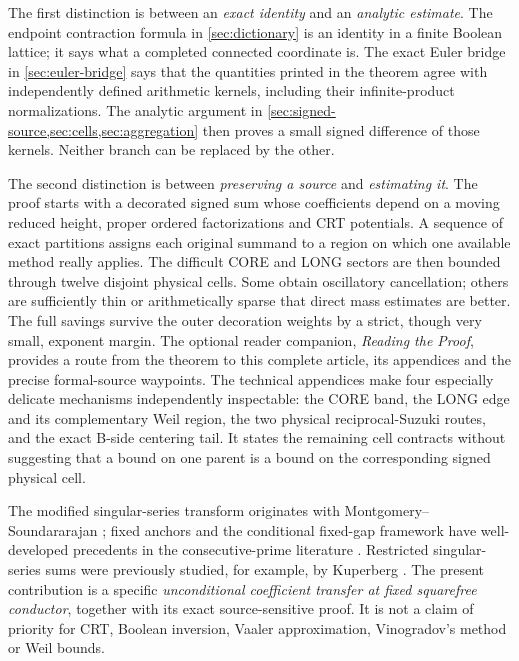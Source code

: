 \documentclass[11pt]{article}
\theoremstyle{definition}
\theoremstyle{remark}
\newcommand{\1}{\mathbf 1}
\begin{document}
The first distinction is between an \emph{exact identity} and
an \emph{analytic estimate}. The endpoint contraction formula in
\cref{sec:dictionary} is an identity in a finite Boolean lattice;
it says what a completed connected coordinate is. The exact
Euler bridge in \cref{sec:euler-bridge} says that the quantities
printed in the theorem agree with independently defined arithmetic
kernels, including their infinite-product normalizations. The
analytic argument in \cref{sec:signed-source,sec:cells,sec:aggregation}
then proves a small signed difference of those kernels.
Neither branch can be replaced by the other.

The second distinction is between \emph{preserving a source} and
\emph{estimating it}. The proof starts with a decorated signed sum
whose coefficients depend on a moving reduced height, proper
ordered factorizations and CRT potentials. A sequence of exact
partitions assigns each original summand to a region on which
one available method really applies. The difficult CORE and LONG
sectors are then bounded through twelve disjoint physical cells.
Some obtain oscillatory cancellation; others are sufficiently thin
or arithmetically sparse that direct mass estimates are better.
The full savings survive the outer decoration weights by a strict,
though very small, exponent margin. The optional reader companion, \emph{Reading the Proof},
provides a route from the theorem to this complete article, its
appendices and the precise formal-source waypoints. The technical
appendices make four especially delicate mechanisms independently
inspectable: the CORE band, the LONG edge and its complementary
Weil region, the two physical reciprocal-Suzuki routes, and the
exact B-side centering tail. It states the remaining cell contracts
without suggesting that a bound on one parent is a bound on the
corresponding signed physical cell.

The modified singular-series transform originates with Montgomery--Soundararajan \cite{MontgomerySoundararajan2004}; fixed anchors and the conditional fixed-gap framework have
well-developed precedents in the consecutive-prime literature
\cite{GoldstonLedoan2011,LemkeOliverSound2016}. Restricted
singular-series sums were previously studied, for example, by
Kuperberg \cite{Kuperberg2025}. The present contribution is a
specific \emph{unconditional coefficient transfer at fixed
squarefree conductor}, together with its exact source-sensitive
proof. It is not a claim of priority for CRT, Boolean inversion,
Vaaler approximation, Vinogradov's method or Weil bounds.
\end{document}
